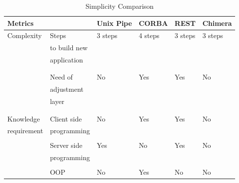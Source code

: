 \documentclass[conference]{IEEEtran}
\begin{document}
\begin{table}[]
\centering
\caption{Simplicity Comparison}
\label{tbl:simplicityTest}
\begin{tabular}{@{}llllll@{}}
\toprule
Metrics      &                 & Unix Pipe     & CORBA         & REST          & Chimera       \\ \midrule
Complexity   & Steps           & 3 steps       & 4 steps       & 3 steps       & 3 steps       \\
             & to build new    &               &               &               &               \\
             & application     &               &               &               &               \\
             &                 &               &               &               &               \\
             &                 &               &               &               &               \\
             & Need of         & No            & Yes           & Yes           & No            \\
             & adjustment      &               &               &               &               \\
             & layer           &               &               &               &               \\
             &                 &               &               &               &               \\
             &                 &               &               &               &               \\ \midrule
Knowledge    & Client side     & No            & Yes           & Yes           & No            \\
requirement  & programming     &               &               &               &               \\
             &                 &               &               &               &               \\
             & Server side     & Yes           & No            & Yes           & No            \\
             & programming     &               &               &               &               \\
             &                 &               &               &               &               \\
             & OOP             & No            & Yes           & No            & No            \\

\end{tabular}
\end{table}
\end{document}
